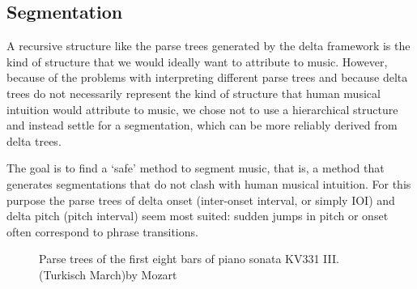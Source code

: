 \documentclass[a4paper,10pt]{article}
\begin{document}
\subsection{Segmentation}
\label{sec:segmentation}

A recursive structure like the parse trees generated by the delta framework is the kind of structure that we would ideally want to attribute to music. However, because of the problems with interpreting different parse trees and because delta trees do not necessarily represent the kind of structure that human musical intuition would attribute to music, we chose not to use a hierarchical structure and instead settle for a segmentation, which can be more reliably derived from delta trees.

The goal is to find a `safe' method to segment music, that is, a method that generates segmentations that do not clash with human musical intuition. For this purpose the parse trees of delta onset (inter-onset interval, or simply \textsc{IOI}) and delta pitch (pitch interval) seem most suited: sudden jumps in pitch or onset often correspond to phrase transitions. 
\begin{figure}
\centering


\caption{Parse trees of the first eight bars of piano sonata KV331 III. (Turkisch March)by Mozart }
\label{fig:pitchonsettrees}
\end{figure}
\end{document}
